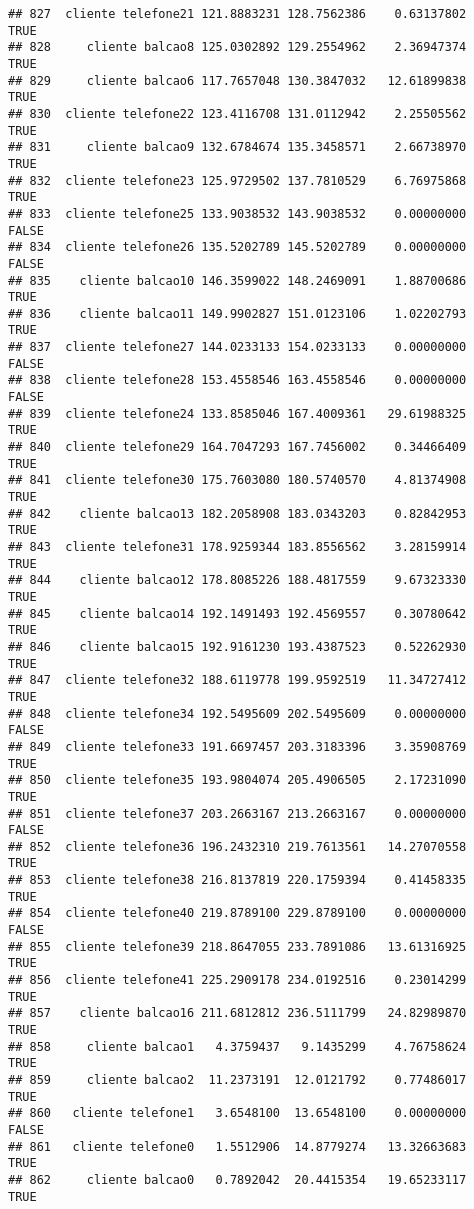 \documentclass[
]{article}
\begin{document}
\begin{verbatim}
## 827  cliente telefone21 121.8883231 128.7562386    0.63137802     TRUE
## 828     cliente balcao8 125.0302892 129.2554962    2.36947374     TRUE
## 829     cliente balcao6 117.7657048 130.3847032   12.61899838     TRUE
## 830  cliente telefone22 123.4116708 131.0112942    2.25505562     TRUE
## 831     cliente balcao9 132.6784674 135.3458571    2.66738970     TRUE
## 832  cliente telefone23 125.9729502 137.7810529    6.76975868     TRUE
## 833  cliente telefone25 133.9038532 143.9038532    0.00000000    FALSE
## 834  cliente telefone26 135.5202789 145.5202789    0.00000000    FALSE
## 835    cliente balcao10 146.3599022 148.2469091    1.88700686     TRUE
## 836    cliente balcao11 149.9902827 151.0123106    1.02202793     TRUE
## 837  cliente telefone27 144.0233133 154.0233133    0.00000000    FALSE
## 838  cliente telefone28 153.4558546 163.4558546    0.00000000    FALSE
## 839  cliente telefone24 133.8585046 167.4009361   29.61988325     TRUE
## 840  cliente telefone29 164.7047293 167.7456002    0.34466409     TRUE
## 841  cliente telefone30 175.7603080 180.5740570    4.81374908     TRUE
## 842    cliente balcao13 182.2058908 183.0343203    0.82842953     TRUE
## 843  cliente telefone31 178.9259344 183.8556562    3.28159914     TRUE
## 844    cliente balcao12 178.8085226 188.4817559    9.67323330     TRUE
## 845    cliente balcao14 192.1491493 192.4569557    0.30780642     TRUE
## 846    cliente balcao15 192.9161230 193.4387523    0.52262930     TRUE
## 847  cliente telefone32 188.6119778 199.9592519   11.34727412     TRUE
## 848  cliente telefone34 192.5495609 202.5495609    0.00000000    FALSE
## 849  cliente telefone33 191.6697457 203.3183396    3.35908769     TRUE
## 850  cliente telefone35 193.9804074 205.4906505    2.17231090     TRUE
## 851  cliente telefone37 203.2663167 213.2663167    0.00000000    FALSE
## 852  cliente telefone36 196.2432310 219.7613561   14.27070558     TRUE
## 853  cliente telefone38 216.8137819 220.1759394    0.41458335     TRUE
## 854  cliente telefone40 219.8789100 229.8789100    0.00000000    FALSE
## 855  cliente telefone39 218.8647055 233.7891086   13.61316925     TRUE
## 856  cliente telefone41 225.2909178 234.0192516    0.23014299     TRUE
## 857    cliente balcao16 211.6812812 236.5111799   24.82989870     TRUE
## 858     cliente balcao1   4.3759437   9.1435299    4.76758624     TRUE
## 859     cliente balcao2  11.2373191  12.0121792    0.77486017     TRUE
## 860   cliente telefone1   3.6548100  13.6548100    0.00000000    FALSE
## 861   cliente telefone0   1.5512906  14.8779274   13.32663683     TRUE
## 862     cliente balcao0   0.7892042  20.4415354   19.65233117     TRUE

\end{verbatim}
\end{document}
